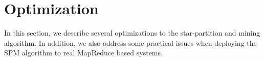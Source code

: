 \section{Optimization}
\label{sec:optimization}
In this section, we describe several optimizations to the star-partition and mining algorithm.
In addition, we also address some practical issues when deploying the SPM algorithm
to real MapReduce based systems.

%
%

